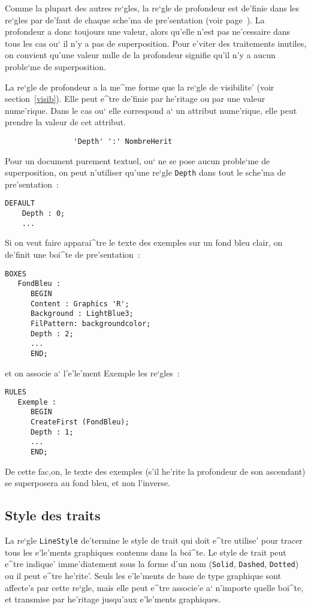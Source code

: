 {Comme la plupart des autres re`gles, la re`gle de profondeur est
de'finie dans les re`gles par de'faut de chaque sche'ma de pre'sentation
(voir page~\pageref{reglesdefaut}).
La profondeur a donc toujours une valeur, alors qu'elle n'est pas
ne'cessaire dans tous les cas ou` il n'y a pas de superposition. Pour
e'viter des traitements inutiles, on convient qu'une valeur nulle de la
profondeur signifie qu'il n'y a aucun proble`me de superposition.

La re`gle de profondeur a la me^me forme que la re`gle de visibilite' (voir
section~\ref{visib}). Elle peut e^tre de'finie par he'ritage ou par une
valeur nume'rique. Dans le cas ou` elle correspond a` un attribut nume'rique,
elle peut prendre la valeur de cet attribut.

\begin{verbatim}
                'Depth' ':' NombreHerit
\end{verbatim}

\begin{example}
Pour un document purement textuel, ou` ne se pose aucun proble`me de
superposition, on peut n'utiliser qu'une re`gle {\tt Depth} dans tout le
sche'ma de pre'sentation~:
\begin{verbatim}
DEFAULT
    Depth : 0;
    ...
\end{verbatim}

Si on veut faire apparai^tre le texte des exemples sur un fond bleu clair, on
de'finit une boi^te de pre'sentation~:
\begin{verbatim}
BOXES
   FondBleu :
      BEGIN
      Content : Graphics 'R';
      Background : LightBlue3;
      FilPattern: backgroundcolor;
      Depth : 2;
      ...
      END;
\end{verbatim}
et on associe a` l'e'le'ment Exemple les re`gles~:
\begin{verbatim}
RULES
   Exemple :
      BEGIN
      CreateFirst (FondBleu);
      Depth : 1;
      ...
      END;
\end{verbatim}
De cette fac,on, le texte des exemples (s'il he'rite la profondeur de son
ascendant) se superposera au fond bleu, et non l'inverse.
\end{example}

\subsection{Style des traits}
\label{styletrait}

La re`gle {\tt LineStyle} de'termine le style de trait qui doit e^tre utilise'
pour tracer tous les e'le'ments graphiques contenus dans la boi^te.
Le style de trait peut e^tre indique' imme'diatement sous la forme d'un nom
({\tt Solid}, {\tt Dashed}, {\tt Dotted}) ou il peut e^tre he'rite'.
Seuls les e'le'ments de base de type graphique sont affecte's par cette re`gle,
mais elle peut e^tre associe'e a` n'importe quelle boi^te, et transmise par
he'ritage jusqu'aux e'le'ments graphiques.

}
